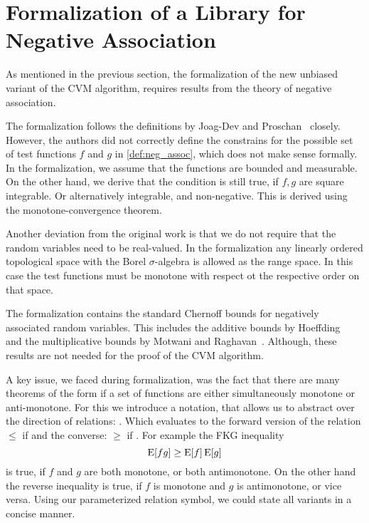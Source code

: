 \section{Formalization of a Library for Negative Association}\label{sec:formalization_neg_dep}
As mentioned in the previous section, the formalization of the new unbiased variant of the CVM algorithm, requires results from the theory of negative association.

The formalization follows the definitions by Joag-Dev and Proschan~\cite{joagdev1983} closely.
However, the authors did not correctly define the constrains for the possible set of test functions $f$ and $g$ in \cref{def:neg_assoc}, which does not make sense formally.
In the formalization, we assume that the functions are bounded and measurable.
On the other hand, we derive that the condition is still true, if $f, g$ are square integrable.
Or alternatively integrable, and non-negative.
This is derived using the monotone-convergence theorem.

Another deviation from the original work is that we do not require that the random variables need to be real-valued.
In the formalization any linearly ordered topological space with the Borel $\sigma$-algebra is allowed as the range space.
In this case the test functions must be monotone with respect ot the respective order on that space.

The formalization contains the standard Chernoff bounds for negatively associated random variables.
This includes the additive bounds by Hoeffding~\cite[Th. 1, 2]{hoeffding1963} and the multiplicative bounds by Motwani and Raghavan~\cite[Th. 4.1, 4.2]{motwani1995}.
Although, these results are not needed for the proof of the CVM algorithm.

A key issue, we faced during formalization, was the fact that there are many theorems of the form if a set of functions are either simultaneously monotone or anti-monotone.
For this we introduce a notation, that allows us to abstract over the direction of relations: \isa{\isasymle\isasymge\isactrlbsub\isasymeta\isactrlesub}.
Which evaluates to the forward version of the relation $\leq$ if  and the converse: $\geq$ if .
For example the FKG inequality
\[
  \operatorname{\mathrm{E}} [f g] \geq \operatorname{\mathrm{E}} [f] \operatorname{\mathrm{E}} [g]
\]
is true, if $f$ and $g$ are both monotone, or both antimonotone.
On the other hand the reverse inequality is true, if $f$ is monotone and $g$ is antimonotone, or vice versa.
Using our parameterized relation symbol, we could state all variants in a concise manner.


